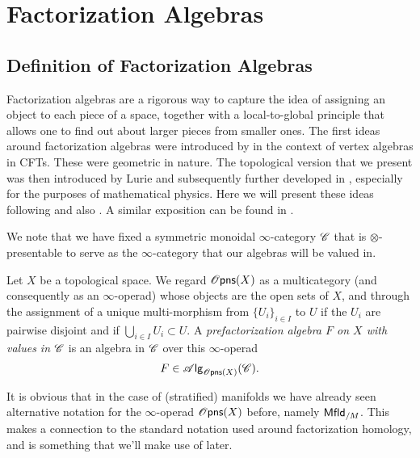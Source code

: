 \documentclass[../text]{subfiles}
\begin{document}
\section{Factorization Algebras}\label{ch:fact_alg}

\subsection{Definition of Factorization Algebras}

Factorization algebras are a rigorous way to capture the idea of assigning an object to each piece of a space, together with a local-to-global principle that allows one to find out about larger pieces from smaller ones. The first ideas around factorization algebras were introduced by \cite{bd2004} in the context of vertex algebras in CFTs. These were geometric in nature. The topological version that we present was then introduced by Lurie and subsequently further developed in \cite{cg2016}, especially for the purposes of mathematical physics. Here we will present these ideas following \cite{cg2016} and also \cite{af_primer}. A similar exposition can be found in \cite{ginot2015}.

\begin{remark}
    We note that we have fixed a symmetric monoidal $\infty$-category $\mathscr{C}$ that is $\otimes$-presentable to serve as the $\infty$-category that our algebras will be valued in.
\end{remark}

\begin{definition}
    Let $X$ be a topological space. We regard $\opens[s](X)$ as a multicategory (and consequently as an $\infty$-operad) whose objects are the open sets of $X$, and through the assignment of a unique multi-morphism from $\{U_i\}_{i \in I}$ to $U$ if the $U_i$ are pairwise disjoint and if $\bigcup_{i \in I} U_i \subset U$. A \emph{prefactorization algebra $F$ on $X$ with values in $\mathscr{C}$} is an algebra in $\mathscr{C}$ over this $\infty$-operad
    \begin{equation}
        F \in \alg{\opens[s](X)}(\catC).
    \end{equation}
\end{definition}

\begin{remark}
    It is obvious that in the case of (stratified) manifolds we have already seen alternative notation for the $\infty$-operad $\opens(X)$ before, namely $\mfld[r]_{/M}$. This makes a connection to the standard notation used around factorization homology, and is something that we'll make use of later.
\end{remark}
\end{document}
